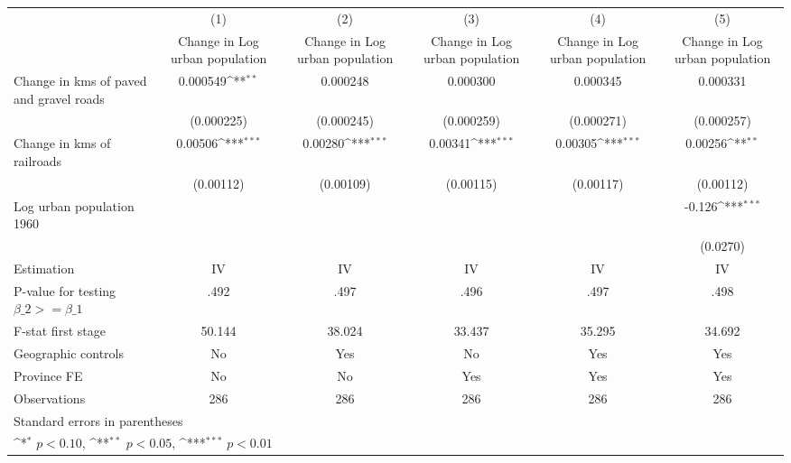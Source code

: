 {
\def\sym#1{\ifmmode^{#1}\else\(^{#1}\)\fi}
\begin{tabular}{l*{5}{c}}
\hline\hline
                    &\multicolumn{1}{c}{(1)}&\multicolumn{1}{c}{(2)}&\multicolumn{1}{c}{(3)}&\multicolumn{1}{c}{(4)}&\multicolumn{1}{c}{(5)}\\
                    &\multicolumn{1}{c}{Change in Log urban population}&\multicolumn{1}{c}{Change in Log urban population}&\multicolumn{1}{c}{Change in Log urban population}&\multicolumn{1}{c}{Change in Log urban population}&\multicolumn{1}{c}{Change in Log urban population}\\
\hline
Change in kms of paved and gravel roads&    0.000549\sym{**} &    0.000248         &    0.000300         &    0.000345         &    0.000331         \\
                    &  (0.000225)         &  (0.000245)         &  (0.000259)         &  (0.000271)         &  (0.000257)         \\
[1em]
Change in kms of railroads&     0.00506\sym{***}&     0.00280\sym{***}&     0.00341\sym{***}&     0.00305\sym{***}&     0.00256\sym{**} \\
                    &   (0.00112)         &   (0.00109)         &   (0.00115)         &   (0.00117)         &   (0.00112)         \\
[1em]
Log urban population 1960&                     &                     &                     &                     &      -0.126\sym{***}\\
                    &                     &                     &                     &                     &    (0.0270)         \\
\hline
Estimation          &          IV         &          IV         &          IV         &          IV         &          IV         \\
P-value for testing $\beta\_2 >= \beta\_1$&        .492         &        .497         &        .496         &        .497         &        .498         \\
F-stat first stage  &      50.144         &      38.024         &      33.437         &      35.295         &      34.692         \\
Geographic controls &          No         &         Yes         &          No         &         Yes         &         Yes         \\
Province FE         &          No         &          No         &         Yes         &         Yes         &         Yes         \\
Observations        &         286         &         286         &         286         &         286         &         286         \\
\hline\hline
\multicolumn{6}{l}{\footnotesize Standard errors in parentheses}\\
\multicolumn{6}{l}{\footnotesize \sym{*} \(p<0.10\), \sym{**} \(p<0.05\), \sym{***} \(p<0.01\)}\\
\end{tabular}
}
